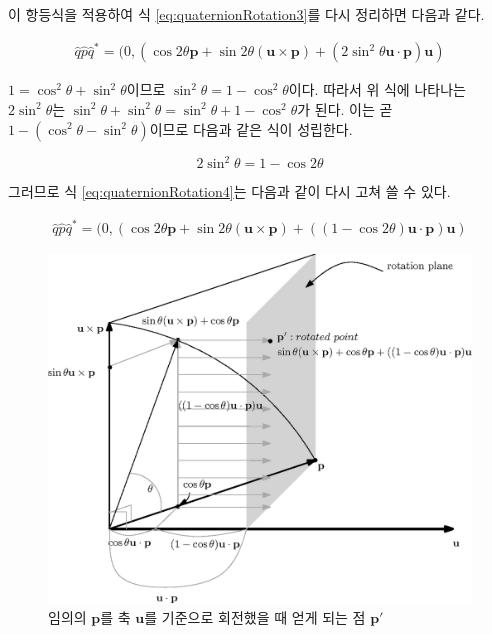 이 항등식을 적용하여 식 \ref{eq:quaternionRotation3}를 다시 정리하면 다음과 같다.

\begin{eqnarray}
\hat q \hat p \hat q^* =  ( 0, (\cos 2\theta \mathbf p + \sin 2 \theta (\mathbf u \times \mathbf p) + (2 \sin^2 \theta \mathbf u \cdot \mathbf p) \mathbf u)
\label{eq:quaternionRotation4}
\end{eqnarray}

$1=\cos^2 \theta + \sin^2 \theta$이므로 $\sin^2 \theta = 1 - \cos^2 \theta$이다.
따라서 위 식에 나타나는 $2\sin^2 \theta$는 $\sin^2 \theta + \sin^2 \theta = \sin^2 \theta + 1 - \cos^2 \theta$가 된다.
이는 곧 $1 - (\cos^2 \theta - \sin^2 \theta)$이므로 다음과 같은 식이 성립한다.

$$2 \sin^2 \theta = 1 - \cos 2 \theta$$

그러므로 식 \ref{eq:quaternionRotation4}는 다음과 같이 다시 고쳐 쓸 수 있다.

\begin{eqnarray}
\hat q \hat p \hat q^* =  ( 0, (\cos 2\theta \mathbf p + \sin 2 \theta (\mathbf u \times \mathbf p) + ((1-\cos 2 \theta) \mathbf u \cdot \mathbf p) \mathbf u)
\label{eq:quaternionRotation5}
\end{eqnarray}



\begin{figure}[h!]
  \centering
    \includegraphics[width=14cm]{Math_quaternion/quaternionRotation.eps}
    \caption{임의의 $\mathbf p$를 축 $\mathbf u$를 기준으로 회전했을 때 얻게 되는 점 $\mathbf p'$}
    \label{fig:quaternion:quaternionRotation}
\end{figure}


